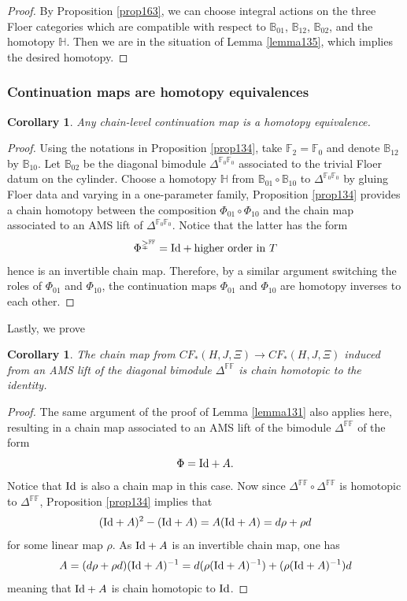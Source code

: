 \documentclass[reqno, 10pt]{amsart}
\numberwithin{equation}{section}
\numberwithin{equation}{section}
\newtheorem{cor}[thm]{Corollary}
\theoremstyle{definition}
\theoremstyle{remark}
\newcommand{\beqn}{\begin{equation*}}
\newcommand{\eeqn}{\end{equation*}}
\newcommand{\mb}{\mathbb}
\begin{document}
\begin{proof}
By Proposition \ref{prop163}, we can choose integral actions on the three Floer categories which are compatible with respect to ${\mb B}_{01}$, ${\mb B}_{12}$, ${\mb B}_{02}$, and the homotopy ${\mb H}$. Then we are in the situation of Lemma \ref{lemma135}, which implies the desired homotopy.
\end{proof}

\subsubsection{Continuation maps are homotopy equivalences}


\begin{cor}
Any chain-level continuation map is a homotopy equivalence. 
\end{cor}

\begin{proof}
Using the notations in Proposition \ref{prop134}, take ${\mb F}_2 = {\mb F}_0$ and denote ${\mb B}_{12}$ by ${\mb B}_{10}$. Let ${\mb B}_{02}$ be the diagonal bimodule $\mb{\Delta}^{\mb{F}_0\mb{F}_0}$ associated to the trivial Floer datum on the cylinder. Choose a homotopy ${\mb H}$ from $\mb{B}_{01} \circ \mb{B}_{10}$ to $\mb{\Delta}^{\mb{F}_0\mb{F}_0}$ by gluing Floer data and varying in a one-parameter family, Proposition \ref{prop134} provides a chain homotopy between the composition $\Phi_{01} \circ \Phi_{10}$ and the chain map associated to an AMS lift of $\mb{\Delta}^{\mb{F}_0\mb{F}_0}$. Notice that the latter has the form 
\beqn
\Phi^{{\mb \Delta}^{\mb{FF}}} = {\rm Id} + {\rm higher\ order\ in\ } T
\eeqn
hence is an invertible chain map. Therefore, by a similar argument switching the roles of $\Phi_{01}$ and $\Phi_{10}$, the continuation maps $\Phi_{01}$ and $\Phi_{10}$ are homotopy inverses to each other. 
\end{proof}

Lastly, we prove 

\begin{cor}
The chain map from $CF_*(H, J, \Xi) \to CF_*(H, J, \Xi)$ induced from an AMS lift of the diagonal bimodule $\mb{\Delta}^{\mb{FF}}$ is  chain homotopic to the identity.
\end{cor}

\begin{proof}
The same argument of the proof of Lemma \ref{lemma131} also applies here, resulting in a chain map associated to an AMS lift of the bimodule $\mb{\Delta}^{\mb{FF}}$ of the form
\beqn
\Phi = {\rm Id} + A.
\eeqn
Notice that ${\rm Id}$ is also a chain map in this case. Now since $\mb{\Delta}^{\mb{FF}} \circ\mb{\Delta}^{\mb{FF}}$ is homotopic to $\mb{\Delta}^{\mb{FF}}$, Proposition \ref{prop134} implies that 
\beqn
({\rm Id} + A)^2 - ({\rm Id} + A) = A ({\rm Id} + A) = d\rho + \rho d
\eeqn
for some linear map $\rho$. As ${\rm Id} + A$ is an invertible chain map, one has 
\beqn
A = (d \rho + \rho d)({\rm Id} + A)^{-1} = d( \rho ({\rm Id} + A)^{-1}) + ( \rho ({\rm Id} + A)^{-1}) d
\eeqn
meaning that ${\rm Id} +A$ is chain homotopic to ${\rm Id}$.
\end{proof}
\end{document}
